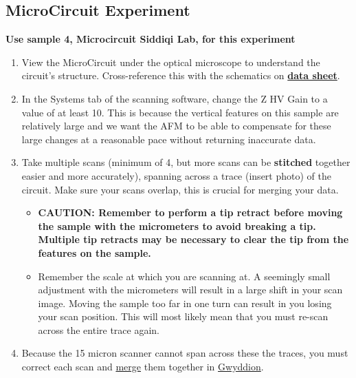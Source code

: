 \documentclass{../lab}
\begin{document}
\subsection{MicroCircuit Experiment}
\label{subsec:Microcircuit}

\textbf{Use sample 4, Microcircuit Siddiqi Lab, for this experiment}

\begin{enumerate}
    \item View the MicroCircuit under the optical microscope to understand the circuit's structure. Cross-reference this with the schematics on \href{http://experimentationlab.berkeley.edu/sites/default/files/AFMImages/CSQ\_Resonators\_1July2011\%20.pdf}{\textbf{data sheet}}.

    \item In the Systems tab of the scanning software, change the Z HV Gain to a value of at least 10.  This is because the vertical features on this sample are relatively large and we want the AFM to be able to compensate for these large changes at a reasonable pace without returning inaccurate data.

    \item Take multiple scans (minimum of 4, but more scans can be \textbf{stitched} together easier and more accurately), spanning across a trace (insert photo) of the circuit.  Make sure your scans overlap, this is crucial for merging your data.

    \begin{itemize}
        \item \textbf{CAUTION: Remember to perform a tip retract before moving the sample with the micrometers to avoid breaking a tip. Multiple tip retracts may be necessary to clear the tip from the features on the sample.}

        \item Remember the scale at which you are scanning at. A seemingly small adjustment with the micrometers will result in a large shift in your scan image. Moving the sample too far in one turn can result in you losing your scan position.  This will most likely mean that you must re-scan across the entire trace again.

    \end{itemize}

    \item Because the 15 micron scanner cannot span across these the traces, you must correct each scan and \hyperref[subsec:ImageMerging]{merge} them together in \hyperref[subsec:Gwyddion]{Gwyddion}.


\end{enumerate}
\end{document}
